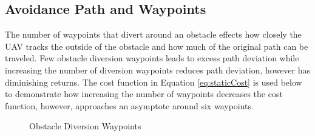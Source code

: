 \documentclass[numbered,pdftex]{ohio-etd}
\begin{document}
\subsection{Avoidance Path and Waypoints}

 The number of waypoints that divert around an obstacle effects how closely the UAV tracks the outside of the obstacle and how much of the original path can be traveled. Few obstacle diversion waypoints leads to excess path deviation while increasing the number of diversion waypoints reduces path deviation, however has diminishing returns. The cost function in Equation \ref{eq:staticCost} is used below to demonstrate how increasing the number of waypoints decreases the cost function, however, approaches an asymptote around six waypoints.


\begin{figure}[H]
	\begin{subfigmatrix}{2}%
		\centering	
		\hspace*{0mm}
	\end{subfigmatrix}
	\caption{Obstacle Diversion Waypoints}
	\label{fig:numWaypointsPath}
\end{figure}
\end{document}

